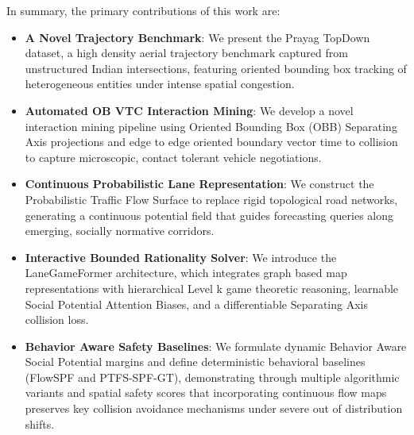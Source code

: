 \documentclass{article}
\begin{document}
In summary, the primary contributions of this work are:
\begin{itemize}
\item \textbf{A Novel Trajectory Benchmark}: We present the Prayag TopDown dataset, a high density aerial trajectory benchmark captured from unstructured Indian intersections, featuring oriented bounding box tracking of heterogeneous entities under intense spatial congestion.
\item \textbf{Automated OB VTC Interaction Mining}: We develop a novel interaction mining pipeline using Oriented Bounding Box (OBB) Separating Axis projections and edge to edge oriented boundary vector time to collision to capture microscopic, contact tolerant vehicle negotiations.
\item \textbf{Continuous Probabilistic Lane Representation}: We construct the Probabilistic Traffic Flow Surface to replace rigid topological road networks, generating a continuous potential field that guides forecasting queries along emerging, socially normative corridors.
\item \textbf{Interactive Bounded Rationality Solver}: We introduce the LaneGameFormer architecture, which integrates graph based map representations with hierarchical Level k game theoretic reasoning, learnable Social Potential Attention Biases, and a differentiable Separating Axis collision loss.
\item \textbf{Behavior Aware Safety Baselines}: We formulate dynamic Behavior Aware Social Potential margins and define deterministic behavioral baselines (FlowSPF and PTFS-SPF-GT), demonstrating through multiple algorithmic variants and spatial safety scores that incorporating continuous flow maps preserves key collision avoidance mechanisms under severe out of distribution shifts.
\end{itemize}
\end{document}
